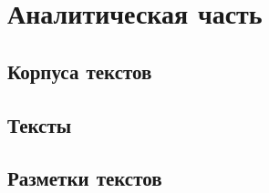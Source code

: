 \section{Аналитическая часть}

\subsection{Корпуса текстов}


\subsection{Тексты}


\subsection{Разметки текстов}

